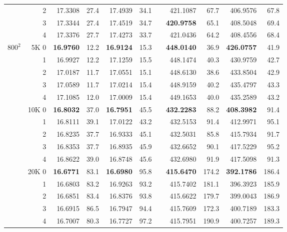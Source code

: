 \begin{table}[p!]
{\begin{tabular*}{\hsize}{crrrrrlrrrr}
        &     2 &      17.3308  & 27.4 &      17.4939  & 34.1 &  &      421.1087  &  67.7 &      406.9576  &  67.8 \\
        &     3 &      17.3344  & 27.4 &      17.4519  & 34.7 &  & {\bf 420.9758} &  65.1 &      408.5048  &  69.4 \\
        &     4 &      17.3376  & 27.7 &      17.4273  & 33.7 &  &      421.0436  &  64.2 &      408.4556  &  68.4 \\
\hline
$800^2$ &  5K 0 & {\bf 16.9760} & 12.2 & {\bf 16.9124} & 15.3 &  & {\bf 448.0140} &  36.9 & {\bf 426.0757} &  41.9 \\
        &     1 &      16.9927  & 12.2 &      17.1259  & 15.5 &  &      448.1474  &  40.3 &      430.9759  &  42.7 \\
        &     2 &      17.0187  & 11.7 &      17.0551  & 15.1 &  &      448.6130  &  38.6 &      433.8504  &  42.9 \\
        &     3 &      17.0589  & 11.7 &      17.0214  & 15.4 &  &      448.9159  &  40.2 &      435.4797  &  43.3 \\
        &     4 &      17.1085  & 12.0 &      17.0009  & 15.4 &  &      449.1653  &  40.0 &      435.2589  &  43.2 \\
\cline{2-11}
        & 10K 0 & {\bf 16.8032} & 37.0 & {\bf 16.7951} & 45.5 &  & {\bf 432.2283} &  88.2 & {\bf 408.3982} &  91.4 \\
        &     1 &      16.8111  & 39.1 &      17.0122  & 43.2 &  &      432.5153  &  91.4 &      412.9971  &  95.1 \\
        &     2 &      16.8235  & 37.7 &      16.9333  & 45.1 &  &      432.5031  &  85.8 &      415.7934  &  91.7 \\
        &     3 &      16.8353  & 37.7 &      16.8935  & 45.9 &  &      432.6652  &  90.1 &      417.5229  &  95.2 \\
        &     4 &      16.8622  & 39.0 &      16.8748  & 45.6 &  &      432.6980  &  91.9 &      417.5098  &  91.3 \\
\cline{2-11}
        & 20K 0 & {\bf 16.6771} & 83.1 & {\bf 16.6980} & 95.8 &  & {\bf 415.6470} & 174.2 & {\bf 392.1786} & 186.4 \\
        &     1 &      16.6803  & 83.2 &      16.9263  & 93.2 &  &      415.7402  & 181.1 &      396.3923  & 185.9 \\
        &     2 &      16.6851  & 83.4 &      16.8376  & 93.8 &  &      415.6622  & 179.7 &      399.0043  & 186.9 \\
        &     3 &      16.6915  & 86.5 &      16.7947  & 94.4 &  &      415.7609  & 172.3 &      400.7189  & 183.3 \\
        &     4 &      16.7007  & 80.3 &      16.7727  & 97.2 &  &      415.7951  & 190.9 &      400.7257  & 189.3 \\
\hline
\end{tabular*}}
\end{table}

